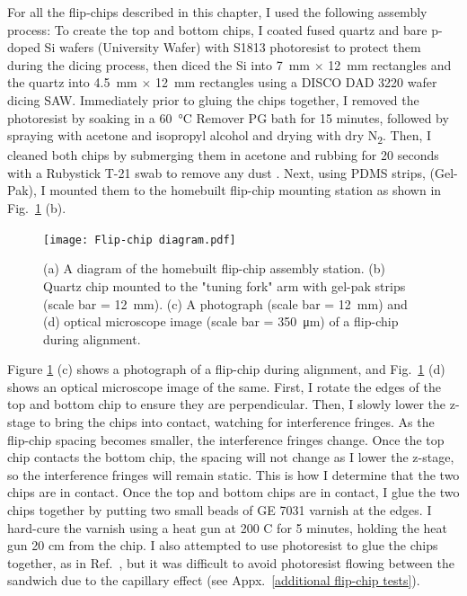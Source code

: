\documentclass[double,12pt,1in,seploa]{beavtex}
\begin{document}
For all the flip-chips described in this chapter, I used the following assembly process: To create the top and bottom chips, I coated fused quartz and bare p-doped Si wafers (University Wafer) with S1813 photoresist to protect them during the dicing process, then diced the Si into \SI{7}{\milli\meter} $\times$ \SI{12}{\milli\meter} rectangles and the quartz into \SI{4.5}{\milli\meter} $\times$ \SI{12}{\milli\meter} rectangles using a DISCO DAD 3220 wafer dicing SAW. Immediately prior to gluing the chips together, I removed the photoresist by soaking in a \SI{60}{\celsius} Remover PG bath for 15 minutes, followed by spraying with acetone and isopropyl alcohol and drying with dry N\textsubscript{2}. Then, I cleaned both chips by submerging them in acetone and rubbing for 20 seconds with a Rubystick T-21 swab to remove any dust \cite{lane_integrating_2021}. Next, using PDMS strips, (Gel-Pak), I mounted them to the homebuilt flip-chip mounting station as shown in Fig.\ \ref{flip-chip diagram} (b). 

\begin{figure}
    \texttt{[image: Flip-chip diagram.pdf]}
    \caption{(a) A diagram of the homebuilt flip-chip assembly station. (b) Quartz chip mounted to the "tuning fork" arm with gel-pak strips (scale bar = \SI{12}{\milli\meter}). (c) A photograph (scale bar = \SI{12}{\milli\meter}) and (d) optical microscope image (scale bar = \SI{350}{\micro\meter}) of a flip-chip during alignment.}
    \label{flip-chip diagram}
\end{figure}

Figure \ref{flip-chip diagram} (c) shows a photograph of a flip-chip during alignment, and Fig.\ \ref{flip-chip diagram} (d) shows an optical microscope image of the same. First, I rotate the edges of the top and bottom chip to ensure they are perpendicular. Then, I slowly lower the z-stage to bring the chips into contact, watching for interference fringes. As the flip-chip spacing becomes smaller, the interference fringes change. Once the top chip contacts the bottom chip, the spacing will not change as I lower the z-stage, so the interference fringes will remain static. This is how I determine that the two chips are in contact. Once the top and bottom chips are in contact, I glue the two chips together by putting two small beads of GE 7031 varnish at the edges. I hard-cure the varnish using a heat gun at 200 C for 5 minutes, holding the heat gun 20 cm from the chip. I also attempted to use photoresist to glue the chips together, as in Ref.\ \cite{beukman_noninvasive_2015}, but it was difficult to avoid photoresist flowing between the sandwich due to the capillary effect (see Appx.\ \ref{additional flip-chip tests}).
\end{document}
